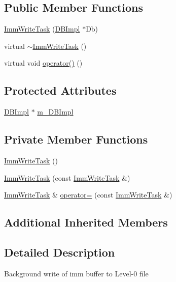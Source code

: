 \subsection*{Public Member Functions}
\begin{DoxyCompactItemize}
\item 
\hyperlink{classleveldb_1_1_imm_write_task_ac7dd68481cac896a1bc24822f1d0db4f}{Imm\+Write\+Task} (\hyperlink{classleveldb_1_1_d_b_impl}{D\+B\+Impl} $\ast$Db)
\item 
virtual \hyperlink{classleveldb_1_1_imm_write_task_a306aa20959a7d464e4186ce3736a5bda}{$\sim$\+Imm\+Write\+Task} ()
\item 
virtual void \hyperlink{classleveldb_1_1_imm_write_task_a7cec4d0a9c768feacded04d654723539}{operator()} ()
\end{DoxyCompactItemize}
\subsection*{Protected Attributes}
\begin{DoxyCompactItemize}
\item 
\hyperlink{classleveldb_1_1_d_b_impl}{D\+B\+Impl} $\ast$ \hyperlink{classleveldb_1_1_imm_write_task_a97940b9c99aba9e6b46b80c77d8a07c6}{m\+\_\+\+D\+B\+Impl}
\end{DoxyCompactItemize}
\subsection*{Private Member Functions}
\begin{DoxyCompactItemize}
\item 
\hyperlink{classleveldb_1_1_imm_write_task_a685fb616d0ae5f7cfd7920f88d9f1281}{Imm\+Write\+Task} ()
\item 
\hyperlink{classleveldb_1_1_imm_write_task_abad084a09b8f6f2b8747c287b3deb376}{Imm\+Write\+Task} (const \hyperlink{classleveldb_1_1_imm_write_task}{Imm\+Write\+Task} \&)
\item 
\hyperlink{classleveldb_1_1_imm_write_task}{Imm\+Write\+Task} \& \hyperlink{classleveldb_1_1_imm_write_task_ac1fc6d6f8a70d8b1788c1f0ef09bd651}{operator=} (const \hyperlink{classleveldb_1_1_imm_write_task}{Imm\+Write\+Task} \&)
\end{DoxyCompactItemize}
\subsection*{Additional Inherited Members}


\subsection{Detailed Description}
Background write of imm buffer to Level-\/0 file 

